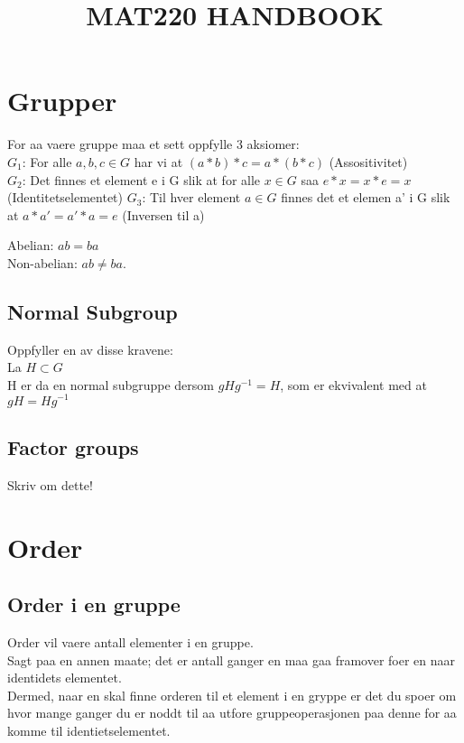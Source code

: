 \documentclass[12pt,a4paper]{article}
\title{MAT220 HANDBOOK}
\begin{document}
%

\maketitle

\section*{Grupper}
For aa vaere gruppe maa et sett oppfylle 3 aksiomer:\\
$G_1$: For alle $a,b,c \in G$ har vi at $(a*b)*c = a*(b*c)$ (Assositivitet)\\
$G_2$: Det finnes et element e i G slik at for alle $x \in G$ saa $e*x = x*e = x$ (Identitetselementet)
$G_3$: Til hver element $a \in G$ finnes det et elemen a' i G slik at $a*a' = a'*a = e$ (Inversen til a)

Abelian: $ab = ba$\\
Non-abelian: $ab \neq ba$.

\subsection*{Normal Subgroup}
Oppfyller en av disse kravene:\\
La $H \subset G$\\
H er da en normal subgruppe dersom $gHg^{-1} = H$, som er ekvivalent med at\\
$gH = Hg^{-1}$

\subsection*{Factor groups}
Skriv om dette!

\section*{Order}
\subsection*{Order i en gruppe}
Order vil vaere antall elementer i en gruppe.\\
Sagt paa en annen maate; det er antall ganger en maa gaa framover foer en naar identidets elementet. \\
Dermed, naar en skal finne orderen til et element i en gryppe er det du spoer om hvor mange ganger du er noddt til aa utfore gruppeoperasjonen paa denne for aa komme til identietselementet.
\end{document}
